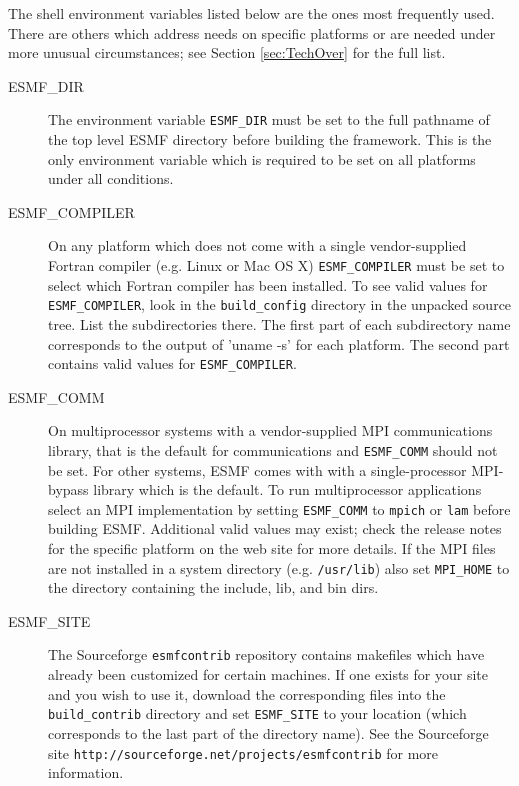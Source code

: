 The shell environment variables listed below are the ones most
frequently used.  There are others which address needs on specific
platforms or are needed under more unusual circumstances; 
see Section \ref{sec:TechOver} for the full list.  
\begin{description}

\item[ESMF\_DIR]
The environment variable {\tt ESMF\_DIR} must be set to the full pathname 
of the top level ESMF directory before building the framework.  This is the 
only environment variable which is required to be set on all platforms under 
all conditions.

\item[ESMF\_COMPILER]
On any platform which does not come with a single vendor-supplied Fortran 
compiler (e.g. Linux or Mac OS X) {\tt ESMF\_COMPILER} must be set to select
which Fortran compiler has been installed.  To see valid values for 
{\tt ESMF\_COMPILER}, look in the {\tt build\_config} directory in the
unpacked source tree.  List the subdirectories there.
The first part of each subdirectory name corresponds to the output 
of 'uname -s' for each platform.  The second part contains valid values 
for {\tt ESMF\_COMPILER}.

\item[ESMF\_COMM]
On multiprocessor systems with a vendor-supplied MPI communications library,
that is the default for communications and {\tt ESMF\_COMM} should not be set.  
For other systems, ESMF comes with with a single-processor MPI-bypass 
library which is the default.   To run multiprocessor applications
select an MPI implementation by setting {\tt ESMF\_COMM} to {\tt mpich} or
{\tt lam} before building ESMF.  Additional valid values may exist; check the
release notes for the specific platform on the web site for more details.
If the MPI files are not installed in a system directory (e.g. {\tt /usr/lib})
also set {\tt MPI\_HOME} to the directory containing the include, lib, 
and bin dirs.

\item[ESMF\_SITE]
The Sourceforge {\tt esmfcontrib} repository contains makefiles which have 
already been customized for certain machines.  If one exists for your site 
and you wish to use it, download the corresponding files into the 
{\tt build\_contrib} directory
and set {\tt ESMF\_SITE} to your location (which corresponds to the last
part of the directory name).  See the Sourceforge site
{\tt http://sourceforge.net/projects/esmfcontrib} for more information.


\end{description}
